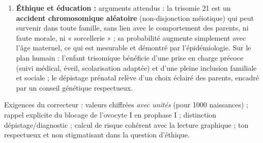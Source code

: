 \documentclass[11pt]{article}
\begin{document}
\begin{corrige}
\begin{enumerate}
    Technique \textbf{non invasive} en développement : le dépistage par \textbf{ADN fœtal libre circulant} dans le sang maternel (DPNI, dès 10 SA), sans risque pour le fœtus, mais restant un test de \emph{dépistage} à confirmer par caryotype.
    \item \textbf{Éthique et éducation :} arguments attendus : la trisomie 21 est un \textbf{accident chromosomique aléatoire} (non-disjonction méiotique) qui peut survenir dans toute famille, sans lien avec le comportement des parents, ni faute morale, ni « sorcellerie » ; sa probabilité augmente simplement avec l'âge maternel, ce qui est mesurable et démontré par l'épidémiologie. Sur le plan humain : l'enfant trisomique bénéficie d'une prise en charge précoce (suivi médical, éveil, scolarisation adaptée) et d'une pleine inclusion familiale et sociale ; le dépistage prénatal relève d'un choix éclairé des parents, encadré par un conseil génétique respectueux.
\end{enumerate}
\end{corrige}

\begin{attention}
Exigences du correcteur : valeurs chiffrées \emph{avec unités} (pour 1000 naissances) ; rappel explicite du blocage de l'ovocyte I en prophase I ; distinction dépistage/diagnostic ; calcul de risque cohérent avec la lecture graphique ; ton respectueux et non stigmatisant dans la question d'éthique.
\end{attention}
\end{document}
